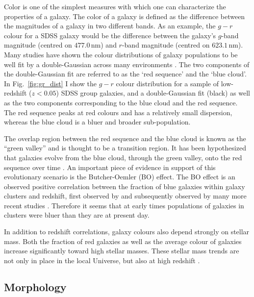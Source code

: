 Color is one of the simplest measures with which one can characterize
the properties of a galaxy.  The color of a galaxy is defined as the
difference between the magnitudes of a galaxy in two different bands.
As an example, the $g - r$ colour for a SDSS galaxy would be the
difference between the galaxy's $g$-band magnitude (centred on
$477.0\,\mathrm{nm}$) and $r$-band magnitude (centred on
$623.1\,\mathrm{nm}$).  Many studies have shown the colour
distributions of galaxy populations to be well fit by a
double-Gaussian across many environments \citep{balogh2004,
  baldry2006}.  The two
components of the double-Gaussian fit are referred to as the `red
sequence' and the `blue cloud'.  In Fig.~\ref{fig:gr_dist} I show the
$g-r$ colour distribution for a sample of low-redshift ($z < 0.05$)
SDSS group galaxies, and a double-Gaussian fit (black) as well as the
two components corresponding to the blue cloud and the red sequence.
The red sequence peaks at red colours and has a
relatively small dispersion, whereas the blue cloud is a bluer and
broader sub-population.
\par
The overlap region between the red sequence
and the blue cloud is known as the ``green valley'' and is thought to
be a transition region.  It has been hypothesized that galaxies evolve
from the blue cloud, through the green valley, onto the red sequence
over time \citep[e.g.][]{trayford2016}.  An important piece of evidence in
support of
this evolutionary scenario is the Butcher-Oemler (BO) effect.  The BO
effect is an observed positive correlation between the fraction of blue
galaxies within galaxy clusters and redshift, first observed by
\citet{butcher1978} and subsequently observed by many more recent
studies \citep[e.g.][]{butcher1984, ellingson2001, loh2008,
  urquhart2010}.  Therefore it seems that at early times populations
of galaxies in clusters were bluer than they are at present day.
\par
In addition to redshift correlations, galaxy colours also depend
strongly on stellar mass.  Both the fraction of red galaxies \citep{baldry2006,
  bamford2009, kimm2009, prescott2011} as well as the average colour
of galaxies \citep{cooper2008, vandenbosch2008a} increase significantly toward
high stellar masses.  These stellar mass trends are not only in place
in the local Universe, but also at high redshift \citep{grutzbauch2011}.

\subsection{Morphology}
\label{sec:morph}

